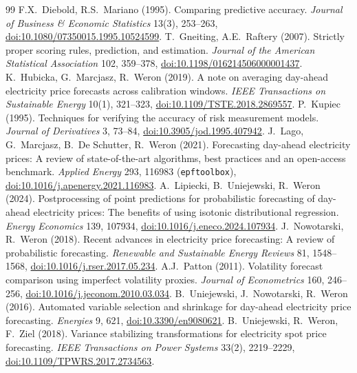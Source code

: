 \begin{thebibliography}{99}\small
{} F.X.~Diebold, R.S.~Mariano (1995). Comparing predictive accuracy. \emph{Journal of Business \& Economic Statistics} 13(3), 253--263, \href{https://doi.org/10.1080/07350015.1995.10524599}{doi:10.1080/07350015.1995.10524599}.
 T.~Gneiting, A.E.~Raftery (2007). Strictly proper scoring rules, prediction, and estimation. \emph{Journal of the American Statistical Association} 102, 359--378, \href{https://doi.org/10.1198/016214506000001437}{doi:10.1198/016214506000001437}.
 K.~Hubicka, G.~Marcjasz, R.~Weron (2019). A note on averaging day-ahead electricity price forecasts across calibration windows. \emph{IEEE Transactions on Sustainable Energy} 10(1), 321--323, \href{https://doi.org/10.1109/TSTE.2018.2869557}{doi:10.1109/TSTE.2018.2869557}.
 P.~Kupiec (1995). Techniques for verifying the accuracy of risk measurement models. \emph{Journal of Derivatives} 3, 73--84, \href{https://doi.org/10.3905/jod.1995.407942}{doi:10.3905/jod.1995.407942}.
 J.~Lago, G.~Marcjasz, B.~De Schutter, R.~Weron (2021). Forecasting day-ahead electricity prices: A review of state-of-the-art algorithms, best practices and an open-access benchmark. \emph{Applied Energy} 293, 116983 (\texttt{epftoolbox}), \href{https://doi.org/10.1016/j.apenergy.2021.116983}{doi:10.1016/j.apenergy.2021.116983}.
 A.~Lipiecki, B.~Uniejewski, R.~Weron (2024). Postprocessing of point predictions for probabilistic forecasting of day-ahead electricity prices: The benefits of using isotonic distributional regression. \emph{Energy Economics} 139, 107934, \href{https://doi.org/10.1016/j.eneco.2024.107934}{doi:10.1016/j.eneco.2024.107934}.
 J.~Nowotarski, R.~Weron (2018). Recent advances in electricity price forecasting: A review of probabilistic forecasting. \emph{Renewable and Sustainable Energy Reviews} 81, 1548--1568, \href{https://doi.org/10.1016/j.rser.2017.05.234}{doi:10.1016/j.rser.2017.05.234}.
 A.J.~Patton (2011). Volatility forecast comparison using imperfect volatility proxies. \emph{Journal of Econometrics} 160, 246--256, \href{https://doi.org/10.1016/j.jeconom.2010.03.034}{doi:10.1016/j.jeconom.2010.03.034}.
 B.~Uniejewski, J.~Nowotarski, R.~Weron (2016). Automated variable selection and shrinkage for day-ahead electricity price forecasting. \emph{Energies} 9, 621, \href{https://doi.org/10.3390/en9080621}{doi:10.3390/en9080621}.
 B.~Uniejewski, R.~Weron, F.~Ziel (2018). Variance stabilizing transformations for electricity spot price forecasting. \emph{IEEE Transactions on Power Systems} 33(2), 2219--2229, \href{https://doi.org/10.1109/TPWRS.2017.2734563}{doi:10.1109/TPWRS.2017.2734563}.

\end{thebibliography}

